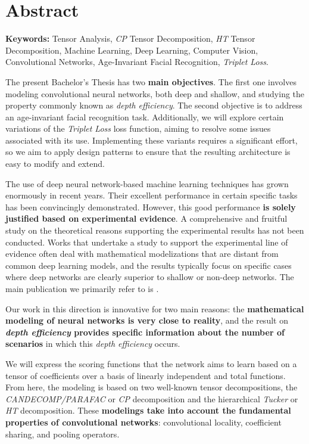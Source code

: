 %

\chapter{Abstract}


\textbf{Keywords:} Tensor Analysis, \textit{CP} Tensor Decomposition, \textit{HT} Tensor Decomposition, Machine Learning, Deep Learning, Computer Vision, Convolutional Networks, Age-Invariant Facial Recognition, \textit{Triplet Loss}.

The present Bachelor's Thesis has two \textbf{main objectives}. The first one involves modeling convolutional neural networks, both deep and shallow, and studying the property commonly known as \textit{depth efficiency}. The second objective is to address an age-invariant facial recognition task. Additionally, we will explore certain variations of the \textit{Triplet Loss} loss function, aiming to resolve some issues associated with its use. Implementing these variants requires a significant effort, so we aim to apply design patterns to ensure that the resulting architecture is easy to modify and extend.

The use of deep neural network-based machine learning techniques has grown enormously in recent years. Their excellent performance in certain specific tasks has been convincingly demonstrated. However, this good performance \textbf{is solely justified based on experimental evidence}. A comprehensive and fruitful study on the theoretical reasons supporting the experimental results has not been conducted. Works that undertake a study to support the experimental line of evidence often deal with mathematical modelizations that are distant from common deep learning models, and the results typically focus on specific cases where deep networks are clearly superior to shallow or non-deep networks. The main publication we primarily refer to is \cite{matematicas:principal}.

Our work in this direction is innovative for two main reasons: the \textbf{mathematical modeling of neural networks is very close to reality}, and the result on \textbf{\textit{depth efficiency} provides specific information about the number of scenarios} in which this \textit{depth efficiency} occurs.

We will express the scoring functions that the network aims to learn based on a tensor of coefficients over a basis of linearly independent and total functions. From here, the modeling is based on two well-known tensor decompositions, the \textit{CANDECOMP/PARAFAC} or \textit{CP} decomposition and the hierarchical \textit{Tucker} or \textit{HT} decomposition. These \textbf{modelings take into account the fundamental properties of convolutional networks}: convolutional locality, coefficient sharing, and pooling operators.

